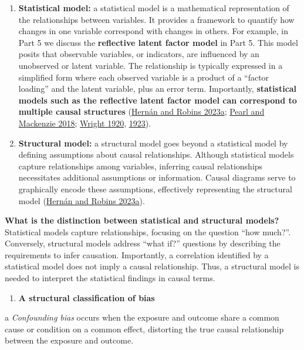 \documentclass[
  singlecolumn]{article}
\providecommand{\tightlist}{%
  \setlength{\itemsep}{0pt}\setlength{\parskip}{0pt}}\usepackage{longtable,booktabs,array}
\begin{document}
\begin{enumerate}
\def\labelenumi{\arabic{enumi}.}
\setcounter{enumi}{16}
\item
  \textbf{Statistical model:} a statistical model is a mathematical
  representation of the relationships between variables. It provides a
  framework to quantify how changes in one variable correspond with
  changes in others. For example, in Part 5 we discuss the
  \textbf{reflective latent factor model} in Part 5. This model posits
  that observable variables, or indicators, are influenced by an
  unobserved or latent variable. The relationship is typically expressed
  in a simplified form where each observed variable is a product of a
  ``factor loading'' and the latent variable, plus an error term.
  Importantly, \textbf{statistical models such as the reflective latent
  factor model can correspond to multiple causal structures}
  (\protect\hyperlink{ref-hernuxe1n2023}{Hernán and Robins 2023a};
  \protect\hyperlink{ref-pearl2018}{Pearl and Mackenzie 2018};
  \protect\hyperlink{ref-wright1920}{Wright 1920},
  \protect\hyperlink{ref-wright1923}{1923}).
\item
  \textbf{Structural model:} a structural model goes beyond a
  statistical model by defining assumptions about causal relationships.
  Although statistical models capture relationships among variables,
  inferring causal relationships necessitates additional assumptions or
  information. Causal diagrams serve to graphically encode these
  assumptions, effectively representing the structural model
  (\protect\hyperlink{ref-hernuxe1n2023}{Hernán and Robins 2023a}).
\end{enumerate}

\textbf{What is the distinction between statistical and structural
models?} Statistical models capture relationships, focusing on the
question ``how much?''. Conversely, structural models address ``what
if?'' questions by describing the requirements to infer causation.
Importantly, a correlation identified by a statistical model does not
imply a causal relationship. Thus, a structural model is needed to
interpret the statistical findings in causal terms.

\begin{enumerate}
\def\labelenumi{\arabic{enumi}.}
\setcounter{enumi}{18}
\tightlist
\item
  \textbf{A structural classification of bias}
\end{enumerate}

a \emph{Confounding bias} occurs when the exposure and outcome share a
common cause or condition on a common effect, distorting the true causal
relationship between the exposure and outcome.
\end{document}
